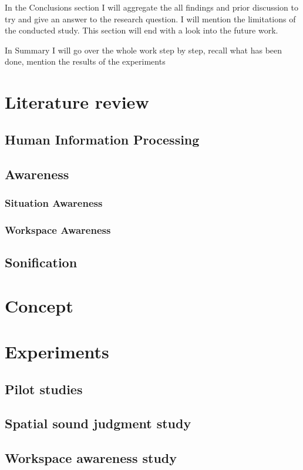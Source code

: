 In the Conclusions section I will aggregate the all findings and prior discussion to try and give an answer to the research question. I will mention the limitations of the conducted study. This section will end with a look into the future work. 

In Summary I will go over the whole work step by step, recall what has been done, mention the results of the experiments

\chapter{Literature review}
\section{Human Information Processing}
\section{Awareness}
\subsection{Situation Awareness}
\subsection{Workspace Awareness}
\section{Sonification}
\chapter{Concept}
\chapter{Experiments}
\section{Pilot studies}
\section{Spatial sound judgment study}
\section{Workspace awareness study}

